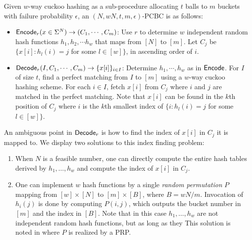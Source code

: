 \begin{construction}
  Given $w$-way cuckoo hashing as a sub-procedure allocating $t$ balls to $m$ buckets with failure probability $\epsilon$, an $(N,wN,t,m,\epsilon)$-PCBC is as follows: 
  \begin{itemize}
    \item ${\sf Encode}_r(x\in\Sigma^N)\rightarrow (C_1,\cdots,C_m)$: Use $r$ to determine $w$ independent random hash functions $h_1,h_2,\cdots h_w$ that maps from $[N]$ to $[m]$.  Let $C_j$ be $\{x[i]:h_l(i) = j$ for some $l\in [w]\}$, in ascending order of $i$. 
    \item ${\sf Decode}_r(I, C_1,\cdots, C_m)\rightarrow \{x[i]\}_{i\in I}$: Determine $h_1,\cdots, h_w$ as in ${\sf Encode}$. For $I$ of size $t$, find a perfect matching from $I$ to $[m]$ using a $w$-way cuckoo hashing scheme. For each $i\in I$, fetch $x[i]$ from $C_j$ where $i$ and $j$ are matched in the perfect matching. Note that $x[i]$ can be found in the $k$th position of $C_j$ where $i$ is the $k$th smallest index of $\{i:h_l(i) = j$ for some $l\in [w]\}$. 
  \end{itemize}
\end{construction}
An ambiguous point in ${\sf Decode}_r$ is how to find the index of $x[i]$ in $C_j$ it is mapped to. We  display two solutions to this index finding problem: 
\begin{enumerate}
  \item When $N$ is a feasible number, one can directly compute the entire hash tables derived by $h_1,\dots, h_w$ and compute the index of $x[i]$ in $C_j$. 
  \item One can implement $w$ hash functions by a single \emph{random permutation} $P$ mapping from $[w]\times [N]$ to $[m]\times [B]$, where $B = wN/m$. Invocation of $h_i(j)$ is done by computing $P(i,j)$, which outputs the bucket number in $[m]$ and the index in $[B]$. Note that in this case $h_1,\dots,h_w$ are not independent random hash functions, but as long as they This solution is noted in \cite{cryptoeprint:2021/580} where $P$ is realized by a PRP. 
\end{enumerate}
